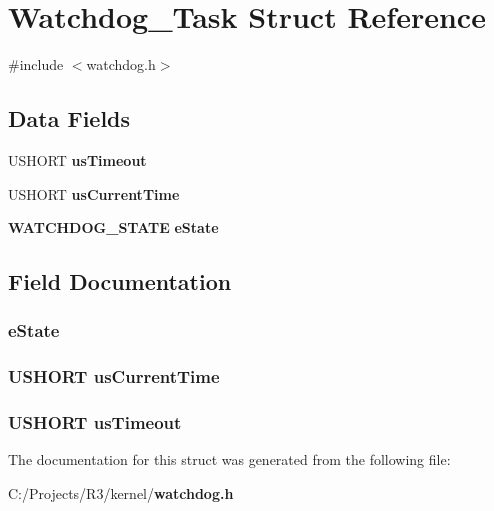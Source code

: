 \section{Watchdog\_\-Task Struct Reference}
\label{struct_watchdog___task}


{\ttfamily \#include $<$watchdog.h$>$}\subsection*{Data Fields}
\begin{DoxyCompactItemize}
\item 
USHORT {\bf usTimeout}
\item 
USHORT {\bf usCurrentTime}
\item 
{\bf WATCHDOG\_\-STATE} {\bf eState}
\end{DoxyCompactItemize}


\subsection{Field Documentation}
\subsubsection[{eState}]{ {\bf eState}}\label{struct_watchdog___task_a05ff3334b266d62f6fd3425c2327abf2}
\subsubsection[{usCurrentTime}]{\setlength{\rightskip}{0pt plus 5cm}USHORT {\bf usCurrentTime}}\label{struct_watchdog___task_a019c5cf7f289defd8d12add96b8cd64c}
\subsubsection[{usTimeout}]{\setlength{\rightskip}{0pt plus 5cm}USHORT {\bf usTimeout}}\label{struct_watchdog___task_a7e4ebbce05d26e8b1e308ac02496263b}


The documentation for this struct was generated from the following file:\begin{DoxyCompactItemize}
\item 
C:/Projects/R3/kernel/{\bf watchdog.h}\end{DoxyCompactItemize}
